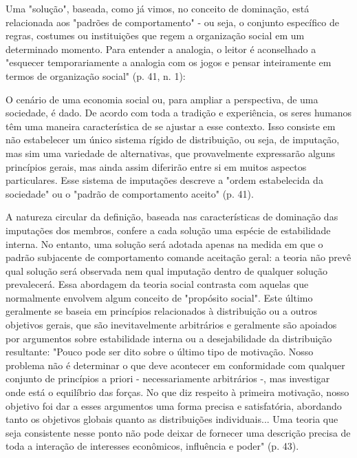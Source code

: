 \documentclass[12pt]{article}
\begin{document}
Uma "solução", baseada, como já vimos, no conceito de dominação, está relacionada aos "padrões de comportamento" - ou seja, o conjunto específico de regras, costumes ou instituições que regem a organização social em um determinado momento. Para entender a analogia, o leitor é aconselhado a "esquecer temporariamente a analogia com os jogos e pensar inteiramente em termos de organização social" (p. 41, n. 1):

O cenário de uma economia social ou, para ampliar a perspectiva, de uma sociedade, é dado. De acordo com toda a tradição e experiência, os seres humanos têm uma maneira característica de se ajustar a esse contexto. Isso consiste em não estabelecer um único sistema rígido de distribuição, ou seja, de imputação, mas sim uma variedade de alternativas, que provavelmente expressarão alguns princípios gerais, mas ainda assim diferirão entre si em muitos aspectos particulares. Esse sistema de imputações descreve a "ordem estabelecida da sociedade" ou o "padrão de comportamento aceito" (p. 41).

A natureza circular da definição, baseada nas características de dominação das imputações dos membros, confere a cada solução uma espécie de estabilidade interna. No entanto, uma solução será adotada apenas na medida em que o padrão subjacente de comportamento comande aceitação geral: a teoria não prevê qual solução será observada nem qual imputação dentro de qualquer solução prevalecerá. Essa abordagem da teoria social contrasta com aquelas que normalmente envolvem algum conceito de "propósito social". Este último geralmente se baseia em princípios relacionados à distribuição ou a outros objetivos gerais, que são inevitavelmente arbitrários e geralmente são apoiados por argumentos sobre estabilidade interna ou a desejabilidade da distribuição resultante: "Pouco pode ser dito sobre o último tipo de motivação. Nosso problema não é determinar o que deve acontecer em conformidade com qualquer conjunto de princípios a priori - necessariamente arbitrários -, mas investigar onde está o equilíbrio das forças. No que diz respeito à primeira motivação, nosso objetivo foi dar a esses argumentos uma forma precisa e satisfatória, abordando tanto os objetivos globais quanto as distribuições individuais... Uma teoria que seja consistente nesse ponto não pode deixar de fornecer uma descrição precisa de toda a interação de interesses econômicos, influência e poder" (p. 43).
\end{document}
